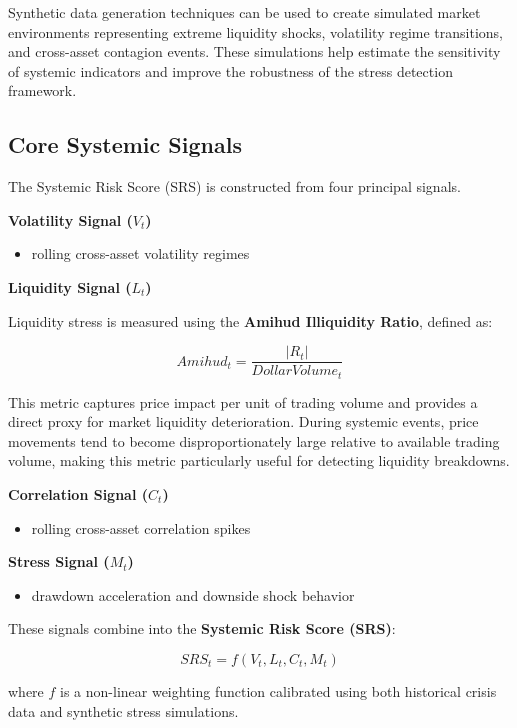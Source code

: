 \documentclass[11pt]{article}
\begin{document}
Synthetic data generation techniques can be used to create simulated market environments representing extreme liquidity shocks, volatility regime transitions, and cross-asset contagion events. These simulations help estimate the sensitivity of systemic indicators and improve the robustness of the stress detection framework.

\subsection{Core Systemic Signals}

The Systemic Risk Score (SRS) is constructed from four principal signals.

\textbf{Volatility Signal ($V_t$)}

\begin{itemize}
\item rolling cross-asset volatility regimes
\end{itemize}

\textbf{Liquidity Signal ($L_t$)}

Liquidity stress is measured using the \textbf{Amihud Illiquidity Ratio}, defined as:

\[
Amihud_t = \frac{|R_t|}{DollarVolume_t}
\]

This metric captures price impact per unit of trading volume and provides a direct proxy for market liquidity deterioration. During systemic events, price movements tend to become disproportionately large relative to available trading volume, making this metric particularly useful for detecting liquidity breakdowns.

\textbf{Correlation Signal ($C_t$)}

\begin{itemize}
\item rolling cross-asset correlation spikes
\end{itemize}

\textbf{Stress Signal ($M_t$)}

\begin{itemize}
\item drawdown acceleration and downside shock behavior
\end{itemize}

These signals combine into the \textbf{Systemic Risk Score (SRS)}:

\[
SRS_t = f(V_t, L_t, C_t, M_t)
\]

where $f$ is a non-linear weighting function calibrated using both historical crisis data and synthetic stress simulations.
\end{document}
